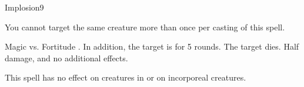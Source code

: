 \begin{spellsection}{Implosion}{9}
\begin{spellheader}
\end{spellheader}
\begin{spellcontent}
    \begin{spelltargetinginfo}
        \spellspecial You cannot target the same creature more than once per casting of this spell.
    \end{spelltargetinginfo}
    \begin{spelleffects}
        \begin{spellattack}{Magic vs. Fortitude}
            \spellsuccess {}. In addition, the target is \staggered for 5 rounds.
            \spellcritical The target dies.
            \spellfailure Half damage, and no additional effects.
        \end{spellattack}
    \end{spelleffects}
\end{spellcontent}
\begin{spellfooter}
    \spellnotes This spell has no effect on creatures in  or on incorporeal creatures.
\end{spellfooter}
\end{spellsection}

